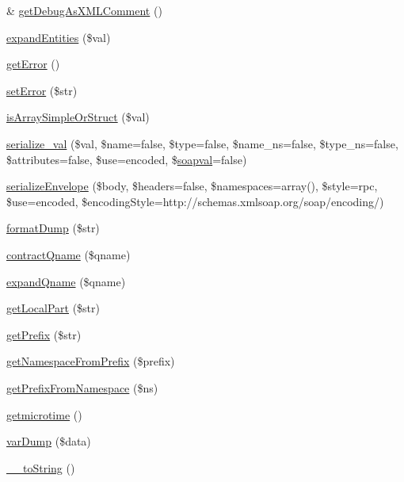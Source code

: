 \begin{DoxyCompactItemize}
\& \hyperlink{classnusoap__base_a756e9d545f662fdd678613ffdbb8b979}{get\+Debug\+As\+X\+M\+L\+Comment} ()
\item 
\hyperlink{classnusoap__base_ad9e06c7fc6850aa47459bab8f5593520}{expand\+Entities} (\$val)
\item 
\hyperlink{classnusoap__base_a24ada5decce3d1b79cd82f5a90ccf404}{get\+Error} ()
\item 
\hyperlink{classnusoap__base_a89a9fdd49ee8436ae44af84f18177bcf}{set\+Error} (\$str)
\item 
\hyperlink{classnusoap__base_a3f7c5ca19c4afead9923f60efc66b9de}{is\+Array\+Simple\+Or\+Struct} (\$val)
\item 
\hyperlink{classnusoap__base_a94dea719fc9af371496f19542112afc3}{serialize\+\_\+val} (\$val, \$name=false, \$type=false, \$name\+\_\+ns=false, \$type\+\_\+ns=false, \$attributes=false, \$use=\textquotesingle{}encoded\textquotesingle{}, \$\hyperlink{classsoapval}{soapval}=false)
\item 
\hyperlink{classnusoap__base_a8b06d8e53a3ca64b0d28d76dbdbd1cb3}{serialize\+Envelope} (\$body, \$headers=false, \$namespaces=array(), \$style=\textquotesingle{}rpc\textquotesingle{}, \$use=\textquotesingle{}encoded\textquotesingle{}, \$encoding\+Style=\textquotesingle{}http\+://schemas.\+xmlsoap.\+org/soap/encoding/\textquotesingle{})
\item 
\hyperlink{classnusoap__base_a25b092fe846b5b64eb91f3e69c0135d7}{format\+Dump} (\$str)
\item 
\hyperlink{classnusoap__base_a80d8fbb13c77aa2c9f55412d3ec42b35}{contract\+Qname} (\$qname)
\item 
\hyperlink{classnusoap__base_a4ae2088629a518bce1dcd587493ba1c5}{expand\+Qname} (\$qname)
\item 
\hyperlink{classnusoap__base_ad8a635f36c991a56a1f922bbb4f4b926}{get\+Local\+Part} (\$str)
\item 
\hyperlink{classnusoap__base_a4065364adef252b0f97ae746c4ad04bf}{get\+Prefix} (\$str)
\item 
\hyperlink{classnusoap__base_ac1674cfdd84b7c057f567b5a412765ca}{get\+Namespace\+From\+Prefix} (\$prefix)
\item 
\hyperlink{classnusoap__base_ac61943e23235475161427270581a0b32}{get\+Prefix\+From\+Namespace} (\$ns)
\item 
\hyperlink{classnusoap__base_acdd881f58961544f44bfe96ad57f1299}{getmicrotime} ()
\item 
\hyperlink{classnusoap__base_a072b06434688ac7c909f822ddbb48535}{var\+Dump} (\$data)
\item 
\hyperlink{classnusoap__base_a7516ca30af0db3cdbf9a7739b48ce91d}{\+\_\+\+\_\+to\+String} ()
\end{DoxyCompactItemize}
